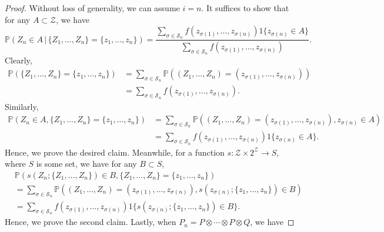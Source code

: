 \documentclass[10pt,a4paper]{amsart}
\newcommand{\cS}{\mathcal{S}}
\newcommand{\cZ}{\mathcal{Z}}
\renewcommand{\P}{\mathbb{P}}
\begin{document}
\begin{proof}
    Without loss of generality, we can assume $i = n$. It suffices to show that for any $A \subset \cZ$, we have
    \begin{equation*}
        \P(Z_n \in A \, | \, \{Z_1, \ldots, Z_n\} = \{z_1, \ldots, z_n\}) = \frac{\sum_{\sigma \in \cS_n} f(z_{\sigma(1)}, \ldots, z_{\sigma(n)}) 1\{z_{\sigma(n)} \in A\}}{\sum_{\sigma \in \cS_n} f(z_{\sigma(1)}, \ldots, z_{\sigma(n)})}.
    \end{equation*}
    Clearly, 
    \begin{equation*}
        \begin{split}
            \P(\{Z_1, \ldots, Z_n\} = \{z_1, \ldots, z_n\})
            & = \sum_{\sigma \in \cS_n} \P((Z_1, \ldots, Z_n) = (z_{\sigma(1)}, \ldots, z_{\sigma(n)})) \\
            & = \sum_{\sigma \in \cS_n} f(z_{\sigma(1)}, \ldots, z_{\sigma(n)}).
        \end{split}
    \end{equation*}
    Similarly, 
    \begin{equation*}
        \begin{split}
            \P(Z_n \in A, \{Z_1, \ldots, Z_n\} = \{z_1, \ldots, z_n\}) 
            & = \sum_{\sigma \in \cS_n} \P((Z_1, \ldots, Z_n) = (z_{\sigma(1)}, \ldots, z_{\sigma(n)}), z_{\sigma(n)} \in A) \\
            & = \sum_{\sigma \in \cS_n} f(z_{\sigma(1)}, \ldots, z_{\sigma(n)}) 1\{z_{\sigma(n)} \in A\}.
        \end{split}
    \end{equation*}
    Hence, we prove the desired claim. Meanwhile, for a function $s \colon \cZ \times 2^\cZ \to S$, where $S$ is some set, we have for any $B \subset S$,
    \begin{equation*}        
        \begin{split}
            & \P(s(Z_n; \{Z_1, \ldots, Z_n\}) \in B, \{Z_1, \ldots, Z_n\} = \{z_1, \ldots, z_n\}) \\
            & = \sum_{\sigma \in \cS_n} \P((Z_1, \ldots, Z_n) = (z_{\sigma(1)}, \ldots, z_{\sigma(n)}), s(z_{\sigma(n)}; \{z_1, \ldots, z_n\}) \in B) \\
            & = \sum_{\sigma \in \cS_n} f(z_{\sigma(1)}, \ldots, z_{\sigma(n)}) 1\{s(z_{\sigma(n)}; \{z_1, \ldots, z_n\}) \in B\}.
        \end{split}
    \end{equation*}
    Hence, we prove the second claim. Lastly, when $P_n = P \otimes \cdots \otimes P \otimes Q$, we have

\end{proof}
\end{document}
